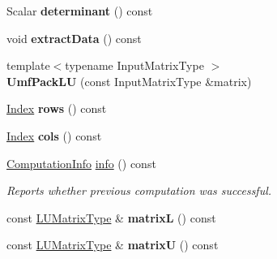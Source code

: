 \begin{DoxyCompactItemize}
\item 
\mbox{\label{class_eigen_1_1_umf_pack_l_u_a4a1635ee0ee23302df3c9ba24bc92f00}} 
Scalar {\bfseries determinant} () const
\item 
\mbox{\label{class_eigen_1_1_umf_pack_l_u_a782dbc0e1ee6cef571e11d6b70c822c1}} 
void {\bfseries extract\+Data} () const
\item 
\mbox{\label{class_eigen_1_1_umf_pack_l_u_a3b0b5f84a7d80617dfb30346557314ee}} 
{\footnotesize template$<$typename Input\+Matrix\+Type $>$ }\\{\bfseries Umf\+Pack\+LU} (const Input\+Matrix\+Type \&matrix)
\item 
\mbox{\label{class_eigen_1_1_umf_pack_l_u_a549f558df5de7839dfba74ca9b9a2572}} 
\hyperlink{namespace_eigen_a62e77e0933482dafde8fe197d9a2cfde}{Index} {\bfseries rows} () const
\item 
\mbox{\label{class_eigen_1_1_umf_pack_l_u_aad5e5a2b1d2e450d9749ae784c3dfa16}} 
\hyperlink{namespace_eigen_a62e77e0933482dafde8fe197d9a2cfde}{Index} {\bfseries cols} () const
\item 
\hyperlink{group__enums_ga85fad7b87587764e5cf6b513a9e0ee5e}{Computation\+Info} \hyperlink{class_eigen_1_1_umf_pack_l_u_a68738a0d99c67316877706f98b033402}{info} () const
\begin{DoxyCompactList}\small\item\em Reports whether previous computation was successful. \end{DoxyCompactList}\item 
\mbox{\label{class_eigen_1_1_umf_pack_l_u_a35ae31390d7c11e9a51b573616fc65ba}} 
const \hyperlink{group___sparse_core___module}{L\+U\+Matrix\+Type} \& {\bfseries matrixL} () const
\item 
\mbox{\label{class_eigen_1_1_umf_pack_l_u_afcbe772b2cbf458791111ae5b648c21a}} 
const \hyperlink{group___sparse_core___module}{L\+U\+Matrix\+Type} \& {\bfseries matrixU} () const
\item 
\mbox{\label{class_eigen_1_1_umf_pack_l_u_aa567568176f719c536ae84bb82128aae}} 

\end{DoxyCompactItemize}
